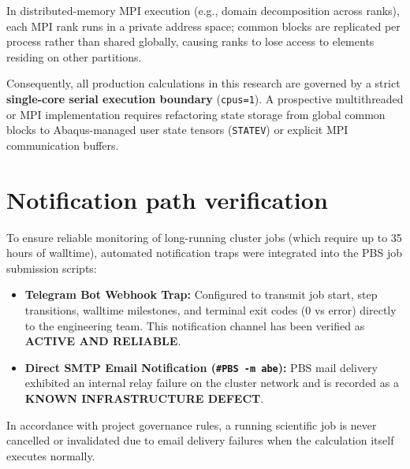 In distributed-memory MPI execution (e.g., domain decomposition across ranks), each MPI rank runs in a private address space; common blocks are replicated per process rather than shared globally, causing ranks to lose access to elements residing on other partitions.

Consequently, all production calculations in this research are governed by a strict \textbf{single-core serial execution boundary} (\texttt{cpus=1}). A prospective multithreaded or MPI implementation requires refactoring state storage from global common blocks to Abaqus-managed user state tensors (\texttt{STATEV}) or explicit MPI communication buffers.

\section{Notification path verification}
To ensure reliable monitoring of long-running cluster jobs (which require up to 35 hours of walltime), automated notification traps were integrated into the PBS job submission scripts:
\begin{itemize}
  \item \textbf{Telegram Bot Webhook Trap:} Configured to transmit job start, step transitions, walltime milestones, and terminal exit codes ($0$ vs error) directly to the engineering team. This notification channel has been verified as \textbf{ACTIVE AND RELIABLE}.
  \item \textbf{Direct SMTP Email Notification (\texttt{\#PBS -m abe}):} PBS mail delivery exhibited an internal relay failure on the cluster network and is recorded as a \textbf{KNOWN INFRASTRUCTURE DEFECT}.
\end{itemize}
In accordance with project governance rules, a running scientific job is never cancelled or invalidated due to email delivery failures when the calculation itself executes normally.
